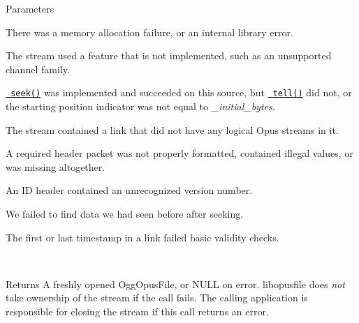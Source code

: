 \begin{DoxyParams}[1]{Parameters}
\begin{DoxyDescription}
\item[\mbox{\hyperlink{group__error__codes_ga2ddb887c0bb55c74ea6be391fabcba59}{O\+P\+\_\+\+E\+F\+A\+U\+LT}} ]There was a memory allocation failure, or an internal library error. 
\item[\mbox{\hyperlink{group__error__codes_gaeea27378f826033ca23584d8403665d3}{O\+P\+\_\+\+E\+I\+M\+PL}} ]The stream used a feature that is not implemented, such as an unsupported channel family. 
\item[\mbox{\hyperlink{group__error__codes_gae0879acafe9cc0ab72462d291fdb6fb6}{O\+P\+\_\+\+E\+I\+N\+V\+AL}} ]{\ttfamily \href{\#op_seek_func}{\texttt{ seek()}}} was implemented and succeeded on this source, but {\ttfamily \href{\#op_tell_func}{\texttt{ tell()}}} did not, or the starting position indicator was not equal to {\itshape \+\_\+initial\+\_\+bytes}. 
\item[\mbox{\hyperlink{group__error__codes_gafca3ae244d24e10b2851c77379453220}{O\+P\+\_\+\+E\+N\+O\+T\+F\+O\+R\+M\+AT}} ]The stream contained a link that did not have any logical Opus streams in it. 
\item[\mbox{\hyperlink{group__error__codes_ga534f1b45c8733a2928434e482b38869f}{O\+P\+\_\+\+E\+B\+A\+D\+H\+E\+A\+D\+ER}} ]A required header packet was not properly formatted, contained illegal values, or was missing altogether. 
\item[\mbox{\hyperlink{group__error__codes_gaa9ae4494f623f3c0609f0b4bd99b8f32}{O\+P\+\_\+\+E\+V\+E\+R\+S\+I\+ON}} ]An ID header contained an unrecognized version number. 
\item[\mbox{\hyperlink{group__error__codes_gaf7b58a439a471366e9eb5b8f2a8cd041}{O\+P\+\_\+\+E\+B\+A\+D\+L\+I\+NK}} ]We failed to find data we had seen before after seeking. 
\item[\mbox{\hyperlink{group__error__codes_gaf82657fc888f1dcf2e0d8f066b8a6cc7}{O\+P\+\_\+\+E\+B\+A\+D\+T\+I\+M\+E\+S\+T\+A\+MP}} ]The first or last timestamp in a link failed basic validity checks. 
\end{DoxyDescription}\\
\hline
\end{DoxyParams}
\begin{DoxyReturn}{Returns}
A freshly opened {\ttfamily Ogg\+Opus\+File}, or {\ttfamily N\+U\+LL} on error. {\ttfamily libopusfile} does {\itshape not} take ownership of the stream if the call fails. The calling application is responsible for closing the stream if this call returns an error. 
\end{DoxyReturn}
\mbox{\label{group__stream__open__close_ga15866bd0cd7ac77162db3b0428962e75}} 
